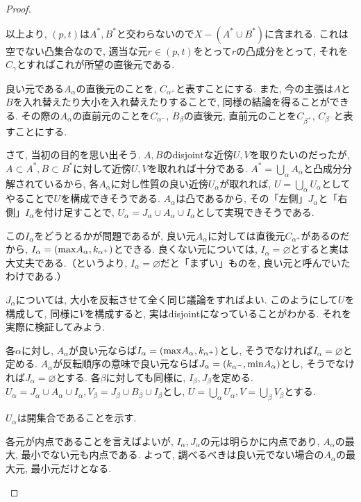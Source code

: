 \documentclass[a4paper, twoside]{bxjsarticle}
\theoremstyle{definition}
\begin{document}
\begin{proof}
\begin{framed}
                以上より, $(p, t)$は$A^*, B^*$と交わらないので$X-(A^*\cup B^*)$に含まれる. これは空でない凸集合なので, 適当な元$r\in (p, t)$をとって$r$の凸成分をとって, それを$C_\gamma$とすればこれが所望の直後元である.
            \end{framed}
            良い元である$A_\alpha$の直後元のことを, $C_{\alpha^+}$と表すことにする. また, 今の主張は$A$と$B$を入れ替えたり大小を入れ替えたりすることで, 同様の結論を得ることができる. その際の$A_\alpha$の直前元のことを$C_{\alpha^-}$, $B_\beta$の直後元, 直前元のことを$C_{\beta^+}$, $C_{\beta^-}$と表すことにする.
            
            \begin{leftbar}
            さて, 当初の目的を思い出そう. $A, B$のdisjointな近傍$U, V$を取りたいのだったが, $A\subset A^*, B\subset B^*$に対して近傍$U, V$を取れれば十分である. $A^*=\bigcup_\alpha A_\alpha$と凸成分分解されているから, 各$A_\alpha$に対し性質の良い近傍$U_\alpha$が取れれば, $U=\bigcup_\alpha U_\alpha$としてやることで$U$を構成できそうである. $A_\alpha$は凸であるから, その「左側」$J_\alpha$と「右側」$I_\alpha$を付け足すことで, $U_\alpha=J_\alpha\cup A_\alpha \cup I_\alpha$として実現できそうである.
            
            この$I_\alpha$をどうとるかが問題であるが, 良い元$A_\alpha$に対しては直後元$C_{\alpha^+}$があるのだから, $I_\alpha = ({\rm max}A_\alpha, k_{\alpha^+})$とできる. 良くない元については, $I_\alpha=\varnothing$とすると実は大丈夫である.（というより, $I_\alpha=\varnothing$だと「まずい」ものを, 良い元と呼んでいたわけである.）
            
            $J_\alpha$については, 大小を反転させて全く同じ議論をすればよい. このようにして$U$を構成して, 同様に$V$を構成すると, 実はdisjointになっていることがわかる. それを実際に検証してみよう.
            \end{leftbar}
            
            各$\alpha$に対し, $A_\alpha$が良い元ならば$I_\alpha=({\rm max}A_\alpha, k_{\alpha^+})$とし, そうでなければ$I_\alpha=\varnothing$と定める. $A_\alpha$が反転順序の意味で良い元ならば$J_\alpha=(k_{\alpha^-}, {\rm min}A_\alpha)$とし, そうでなければ$J_\alpha=\varnothing$とする. 各$\beta$に対しても同様に, $I_\beta, J_\beta$を定める. $U_\alpha = J_\alpha\cup A_\alpha\cup I_\alpha, V_\beta = J_\beta\cup B_\beta\cup I_\beta$とし, $U=\bigcup_\alpha U_\alpha, V=\bigcup_\beta V_\beta$とする.
            
            $U_\alpha$は開集合であることを示す.
            \begin{framed}
                各元が内点であることを言えばよいが, $I_\alpha, J_\alpha$の元は明らかに内点であり, $A_\alpha$の最大, 最小でない元も内点である. よって, 調べるべきは良い元でない場合の$A_\alpha$の最大元, 最小元だけとなる.
                

\end{framed}
\end{proof}
\end{document}
